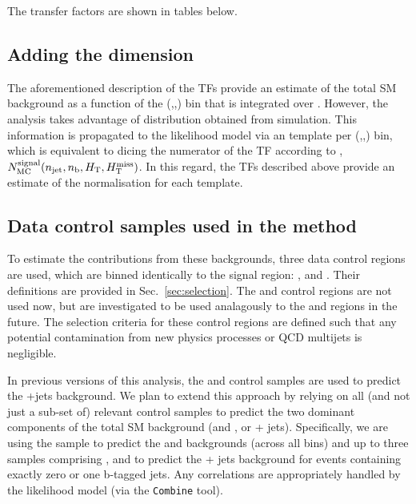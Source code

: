 The transfer factors are shown in tables below.










\clearpage

\subsection{Adding the \mht dimension}

The aforementioned description of the TFs provide an estimate of the
total SM background as a function of the (\njet,\nb,\HT) bin that is
integrated over \mht. However, the analysis takes advantage of \mht
distribution obtained from simulation. This information is propagated
to the likelihood model via an \mht template per (\njet,\nb,\HT) bin,
which is equivalent to dicing the numerator of the TF according to
\mht, \ie $N_{\rm MC}^{\rm signal}(n_{\text{jet}},n_{\text{b}},\mbox{$H_\text{T}$},\mbox{$H_{\rm T}^{\rm miss}$})$. In this
regard, the TFs described above provide an estimate of the
normalisation for each \mht template.

\subsection{Data control samples used in the method}

To estimate the contributions from these backgrounds, three data
control regions are used, which are binned identically to the signal
region: \mj, \mmj and \gj.  Their definitions are provided
in Sec.~\ref{sec:selection}. The \ej and \eej control regions are not
used now, but are investigated to be used analagously to the \mj and \mmj regions in
the future. The selection criteria for these
control regions are defined such that any potential contamination from
new physics processes or QCD multijets is negligible.

In previous versions of this analysis, the \mmj and \gj control
samples are used to predict the \znunu +jets background. We plan to
extend this approach by relying on all (and not just a sub-set of)
relevant control samples to predict the two dominant components of the
total SM background (\wj and \ttbar, or \znunu + jets). Specifically,
we are using the \mj sample to predict the \wj and \ttbar backgrounds
(across all \nb bins) and up to three samples comprising \zmmj,
\gj and \wmj to predict the \znunu + jets background for events
containing exactly zero or one b-tagged jets. Any correlations are
appropriately handled by the likelihood model (via the
\texttt{Combine} tool).

